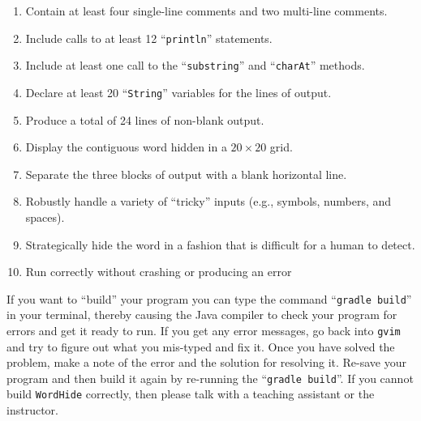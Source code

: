 \documentclass[11pt]{article}
\newcommand{\mainprogram}{\lstinline{WordHide}}
\newcommand{\gradlebuild}{\command{gradle build}}
\newcommand{\command}[1]{``\lstinline{#1}''}
\newcommand{\program}[1]{\lstinline{#1}}
\newcommand{\option}[1]{``{#1}''}
\newcommand{\step}[1]{``{#1}''}
\begin{document}
\vspace*{-.1in}
\begin{enumerate}
  \setlength{\itemsep}{0pt}

\item Contain at least four single-line comments and two multi-line comments.
\item Include calls to at least 12 \command{println} statements.
\item Include at least one call to the \command{substring} and \command{charAt} methods.
\item Declare at least 20 \command{String} variables for the lines of output.
\item Produce a total of 24 lines of non-blank output.
\item Display the contiguous word hidden in a $20 \times 20$ grid.
\item Separate the three blocks of output with a blank horizontal line.
\item Robustly handle a variety of ``tricky'' inputs (e.g., symbols, numbers,
  and spaces).
\item Strategically hide the word in a fashion that is difficult for a human
  to detect.
\item Run correctly without crashing or producing an error

\end{enumerate}


If you want to \step{build} your program you can type the command \gradlebuild{}
in your terminal, thereby causing the Java compiler to check your program for
errors and get it ready to run. If you get any error messages, go back into
\program{gvim} and try to figure out what you mis-typed and fix it. Once you
have solved the problem, make a note of the error and the solution for resolving
it. Re-save your program and then build it again by re-running the
\gradlebuild{}. If you cannot build \mainprogram{} correctly, then please talk
with a teaching assistant or the instructor.
\end{document}
